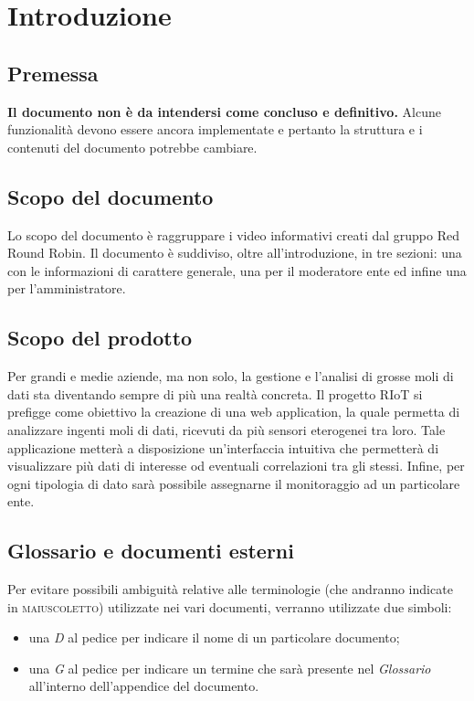 \section{Introduzione}
	\subsection{Premessa}
		\textbf{Il documento non è da intendersi come concluso e definitivo.} Alcune funzionalità devono essere ancora implementate e pertanto la struttura e i contenuti del documento potrebbe cambiare.
	\subsection{Scopo del documento}
		Lo scopo del documento è raggruppare i video informativi creati dal gruppo Red Round Robin. Il documento è suddiviso, oltre all'introduzione, in tre sezioni: una con le informazioni di carattere generale, una per il moderatore ente ed infine una per l'amministratore.	
	\subsection{Scopo del prodotto}
		Per grandi e medie aziende, ma non solo, la gestione e l'analisi di grosse moli di dati sta diventando sempre di più una realtà concreta.
	 	\newline
		Il progetto RIoT si prefigge come obiettivo la creazione di una web application, la quale permetta di analizzare ingenti moli di dati, ricevuti da più sensori eterogenei tra loro. Tale applicazione metterà a disposizione un'interfaccia intuitiva che permetterà di visualizzare più dati di interesse od eventuali correlazioni tra gli stessi. Infine, per ogni tipologia di dato sarà possibile assegnarne il monitoraggio ad un particolare ente.	
	\subsection{Glossario e documenti esterni}
		Per evitare possibili ambiguità relative alle terminologie (che andranno indicate in \textsc{maiuscoletto}) utilizzate nei vari documenti, verranno utilizzate due simboli:
		\begin{itemize}
			\item una \textit{D} al pedice per indicare il nome di un particolare documento;
			\item una \textit{G} al pedice per indicare un termine che sarà presente nel \textit{Glossario} all'interno dell'appendice del documento.
		\end{itemize}
	